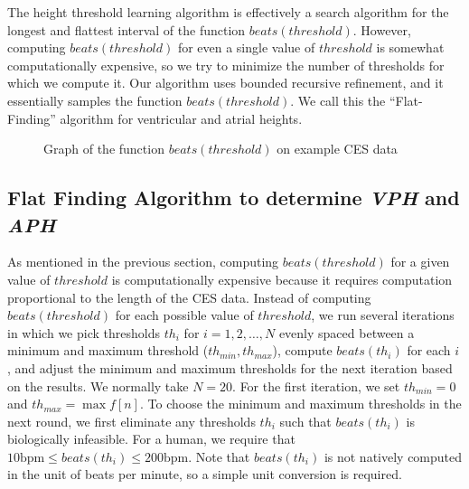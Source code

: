 \documentclass[conference]{IEEEtran}
\newcommand{\APH}{\textit{APH}}
\newcommand{\VPH}{\textit{VPH}}
\begin{document}
The height threshold learning algorithm is effectively a search algorithm for the longest and flattest
interval of the function $beats(threshold)$.
However, computing $beats(threshold)$ for even a single value of $threshold$ 
is somewhat computationally expensive,
so we try to minimize the number of thresholds for which we compute it.
Our algorithm uses bounded recursive refinement, and it essentially samples the function $beats(threshold)$.
We call this the ``Flat-Finding'' algorithm for
ventricular and atrial heights.


\begin{figure}
	\centering
	\caption{Graph of the function $beats(threshold)$ on example CES data}
	\label{fig:beats}
\end{figure}

\subsection{Flat Finding Algorithm to determine \VPH{} and \APH{}}
As mentioned in the previous section, computing $beats(threshold)$ for a given value of $threshold$
is computationally expensive because it requires computation proportional to the length of the CES data.
Instead of computing $beats(threshold)$ for each possible value of $threshold$, we run several iterations in which
we pick thresholds $th_i$ for $i = 1, 2, \dots, N$ evenly spaced
between a minimum and maximum threshold ($th_{min}, th_{max}$), compute
$beats(th_i)$ for each $i$, and adjust the minimum and
maximum thresholds for the next iteration based on the
results. %
We normally take $N=20$.
For the first iteration, we set
$th_{min} = 0$ and $th_{max} = \max f[n]$. 
To choose the minimum and maximum thresholds in
the next round, we first eliminate any thresholds $th_i$
such that $beats(th_i)$ is biologically infeasible. %
For a human, we require that $10 \text{bpm} \le beats(th_i) \le 200 \text{bpm}$.
Note that $beats(th_i)$ is not natively computed in the unit of beats per minute, so a simple unit conversion is required.
\end{document}

